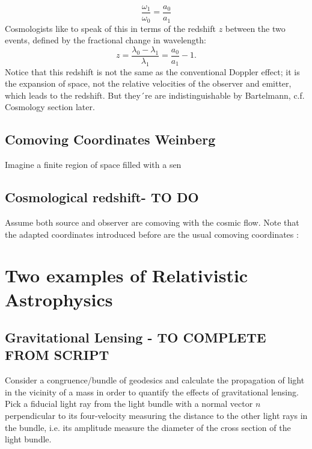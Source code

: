 \begin{equation}
	\frac{\omega_1}{\omega_0} = \frac{a_0}{a_1}
\end{equation}
Cosmologists like to speak of this in terms of the redshift $z$ between the two events, defined
by the fractional change in wavelength:
\begin{equation}
	z=\frac{\lambda_0-\lambda_1}{\lambda_1} = \frac{a_0}{a_1}-1.
\end{equation}
Notice that this redshift is not the same as the conventional Doppler effect; it is the expansion
of space, not the relative velocities of the observer and emitter, which leads to the redshift. But they´re are indistinguishable by Bartelmann, c.f. Cosmology section later. 







\subsection{Comoving Coordinates Weinberg}
Imagine a finite region of space filled with a sen




	\subsection{Cosmological redshift- TO DO}
	Assume both source and observer are comoving with the cosmic flow. Note that the adapted coordinates introduced before are the usual comoving coordinates :	
	
	
	
	 \newpage
	 
	 \section{Two examples of Relativistic Astrophysics}
	\subsection{Gravitational Lensing - TO COMPLETE FROM SCRIPT}
	Consider a congruence/bundle of geodesics and calculate the propagation of light in the vicinity of a mass in order to quantify the effects of gravitational lensing. Pick a fiducial light ray from the light bundle with a normal vector $n$ perpendicular to its four-velocity measuring the distance to the other light rays in the bundle, i.e. its amplitude measure the diameter of the cross section of the light bundle.\\
	
